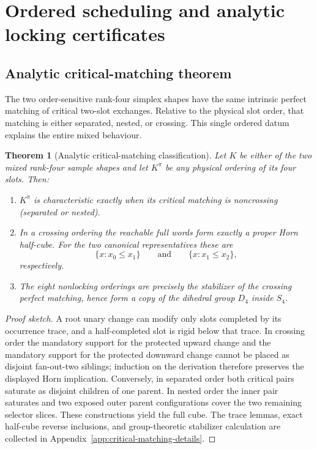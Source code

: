 \documentclass[11pt]{article}
\newtheorem{theorem}[definition]{Theorem}
\begin{document}
\section{Ordered scheduling and analytic locking certificates}
\label{sec:ordered-scheduling}

\subsection{Analytic critical-matching theorem}
\label{subsec:critical-matching-main}

The two order-sensitive rank-four simplex shapes have the same intrinsic
perfect matching of critical two-slot exchanges.  Relative to the physical
slot order, that matching is either separated, nested, or crossing.  This
single ordered datum explains the entire mixed behaviour.

\begin{theorem}[Analytic critical-matching classification]
\label{thm:critical-matching-package}
Let $K$ be either of the two mixed rank-four sample shapes and let $K^\pi$
be any physical ordering of its four slots.  Then:
\begin{enumerate}[label=\textup{(\roman*)},leftmargin=*]
\item $K^\pi$ is characteristic exactly when its critical matching is
noncrossing (separated or nested).
\item In a crossing ordering the reachable full words form exactly a proper
Horn half-cube.  For the two canonical representatives these are
\[
 \{x:x_0\le x_1\}
 \qquad\text{and}\qquad
 \{x:x_1\le x_2\},
\]
respectively.
\item The eight nonlocking orderings are precisely the stabilizer of the
crossing perfect matching, hence form a copy of the dihedral group $D_4$
inside $S_4$.
\end{enumerate}
\end{theorem}

\begin{proof}[Proof sketch]
A root unary change can modify only slots completed by its occurrence trace,
and a half-completed slot is rigid below that trace.  In crossing order the
mandatory support for the protected upward change and the mandatory support
for the protected downward change cannot be placed as disjoint fan-out-two
siblings; induction on the derivation therefore preserves the displayed Horn
implication.  Conversely, in separated order both critical pairs saturate as
disjoint children of one parent.  In nested order the inner pair saturates and
two exposed outer parent configurations cover the two remaining selector
slices.  These constructions yield the full cube.  The trace lemmas, exact
half-cube reverse inclusions, and group-theoretic stabilizer calculation are
collected in Appendix~\ref{app:critical-matching-details}.
\end{proof}
\end{document}
